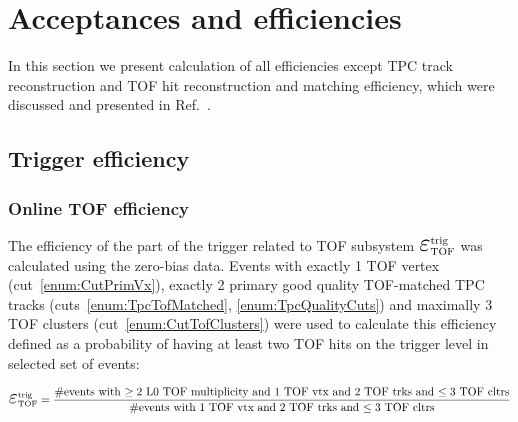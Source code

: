 \section{Acceptances and efficiencies}\label{sec:acceptanceAndEff}

In this section we present calculation of all efficiencies except TPC track reconstruction and TOF hit reconstruction and matching efficiency, which were discussed and presented in Ref.~\cite{supplementaryNote}.

\subsection{Trigger efficiency}\label{sec:triggerEff} 


\subsubsection{Online TOF efficiency}\label{sec:tofOnlineEff}
The efficiency of the part of the trigger related to TOF subsystem $\mbox{\LARGE$\varepsilon$}_{\text{TOF}}^{\text{trig}}$ was calculated using the zero-bias data. Events with exactly 1 TOF vertex (cut~\ref{enum:CutPrimVx}), exactly 2 primary good quality TOF-matched TPC tracks (cuts~\ref{enum:TpcTofMatched}, \ref{enum:TpcQualityCuts}) and maximally 3 TOF clusters (cut~\ref{enum:CutTofClusters}) were used to calculate this efficiency defined as a probability of having at least two TOF hits on the trigger level in selected set of events:

\begin{equation}
 \mbox{\LARGE$\varepsilon$}_{\text{TOF}}^{\text{trig}} = \frac{\text{\#events with $\geq2$ L0 TOF multiplicity and 1 TOF vtx and 2 TOF trks and $\leq3$ TOF cltrs}}{\text{\#events with 1 TOF vtx and 2 TOF trks and $\leq3$ TOF cltrs}}
\end{equation}

